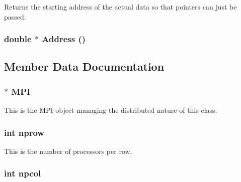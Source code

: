 Returns the starting address of the actual data so that pointers can just be passed. \hypertarget{classJKBuilder_1_1tensor_ac982d9eb84092bfc13694448dd824cbc}{
\subsubsection[{Address}]{\setlength{\rightskip}{0pt plus 5cm}double $\ast$ Address ()}}
\label{classJKBuilder_1_1tensor_ac982d9eb84092bfc13694448dd824cbc}


\subsection{Member Data Documentation}
\hypertarget{classJKBuilder_1_1DistributedMatrix_a3753afd7c89e077643a274ed7c4e9129}{
\subsubsection[{MPI}]{$\ast$ {\bf MPI}}}
\label{classJKBuilder_1_1DistributedMatrix_a3753afd7c89e077643a274ed7c4e9129}


This is the MPI object managing the distributed nature of this class. \hypertarget{classJKBuilder_1_1DistributedMatrix_a3580dd419b5547085d094696e5dcc7b7}{
\subsubsection[{nprow}]{\setlength{\rightskip}{0pt plus 5cm}int {\bf nprow}}}
\label{classJKBuilder_1_1DistributedMatrix_a3580dd419b5547085d094696e5dcc7b7}


This is the number of processors per row. \hypertarget{classJKBuilder_1_1DistributedMatrix_a9d55bf8e4bef97aaacf79db88a9863cc}{
\subsubsection[{npcol}]{\setlength{\rightskip}{0pt plus 5cm}int {\bf npcol}}}
\label{classJKBuilder_1_1DistributedMatrix_a9d55bf8e4bef97aaacf79db88a9863cc}


